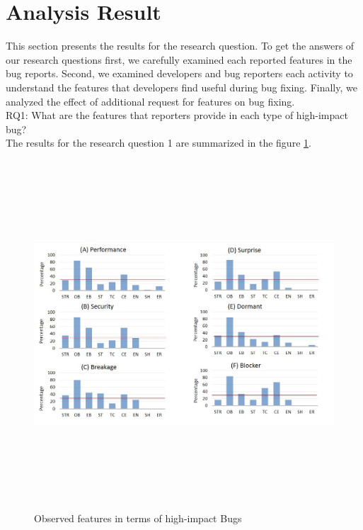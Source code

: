\documentclass[conference]{IEEEtran}
\begin{document}
 \section{Analysis Result}
This section presents the results for the research question. To get the answers of our research questions first, we carefully examined each reported features in the bug reports. Second, we examined developers and bug reporters each activity to understand the features that developers find useful during bug fixing. Finally, we analyzed the effect of additional request for features on bug fixing.\\

RQ1: What are the features that reporters provide in each type of high-impact bug?\\

The results for the research question 1 are summarized in the figure \ref{fig:RQ1}. 
 \begin{figure}[t] %
  \begin{center}
    \includegraphics[width=\textwidth , height=13cm]{Images/RQ1_higB3.jpg}
    \caption{\textsf{Observed features in terms of high-impact Bugs}}
     \label{fig:RQ1}
  \end{center}
  \end{figure}
\end{document}
